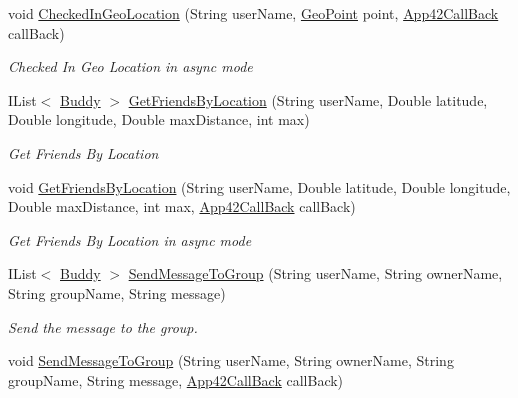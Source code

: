 \begin{DoxyCompactItemize}
void \hyperlink{classcom_1_1shephertz_1_1app42_1_1paas_1_1sdk_1_1csharp_1_1buddy_1_1_buddy_service_a97eb71d786795e36ff552d3bf184de83}{Checked\+In\+Geo\+Location} (String user\+Name, \hyperlink{classcom_1_1shephertz_1_1app42_1_1paas_1_1sdk_1_1csharp_1_1geo_1_1_geo_point}{Geo\+Point} point, \hyperlink{interfacecom_1_1shephertz_1_1app42_1_1paas_1_1sdk_1_1csharp_1_1_app42_call_back}{App42\+Call\+Back} call\+Back)
\begin{DoxyCompactList}\small\item\em Checked In Geo Location in async mode \end{DoxyCompactList}\item 
I\+List$<$ \hyperlink{classcom_1_1shephertz_1_1app42_1_1paas_1_1sdk_1_1csharp_1_1buddy_1_1_buddy}{Buddy} $>$ \hyperlink{classcom_1_1shephertz_1_1app42_1_1paas_1_1sdk_1_1csharp_1_1buddy_1_1_buddy_service_a12eb228d92d28788b47dc96703c72416}{Get\+Friends\+By\+Location} (String user\+Name, Double latitude, Double longitude, Double max\+Distance, int max)
\begin{DoxyCompactList}\small\item\em Get Friends By Location \end{DoxyCompactList}\item 
void \hyperlink{classcom_1_1shephertz_1_1app42_1_1paas_1_1sdk_1_1csharp_1_1buddy_1_1_buddy_service_ac8c3dc5c2ed5a02389848c0685fa2b4e}{Get\+Friends\+By\+Location} (String user\+Name, Double latitude, Double longitude, Double max\+Distance, int max, \hyperlink{interfacecom_1_1shephertz_1_1app42_1_1paas_1_1sdk_1_1csharp_1_1_app42_call_back}{App42\+Call\+Back} call\+Back)
\begin{DoxyCompactList}\small\item\em Get Friends By Location in async mode \end{DoxyCompactList}\item 
I\+List$<$ \hyperlink{classcom_1_1shephertz_1_1app42_1_1paas_1_1sdk_1_1csharp_1_1buddy_1_1_buddy}{Buddy} $>$ \hyperlink{classcom_1_1shephertz_1_1app42_1_1paas_1_1sdk_1_1csharp_1_1buddy_1_1_buddy_service_a4a0bb8efcd45650ac9ed9da33f7f80ba}{Send\+Message\+To\+Group} (String user\+Name, String owner\+Name, String group\+Name, String message)
\begin{DoxyCompactList}\small\item\em Send the message to the group. \end{DoxyCompactList}\item 
void \hyperlink{classcom_1_1shephertz_1_1app42_1_1paas_1_1sdk_1_1csharp_1_1buddy_1_1_buddy_service_ab2842c1eb67e6023675a5c15f85d372d}{Send\+Message\+To\+Group} (String user\+Name, String owner\+Name, String group\+Name, String message, \hyperlink{interfacecom_1_1shephertz_1_1app42_1_1paas_1_1sdk_1_1csharp_1_1_app42_call_back}{App42\+Call\+Back} call\+Back)

\end{DoxyCompactItemize}
